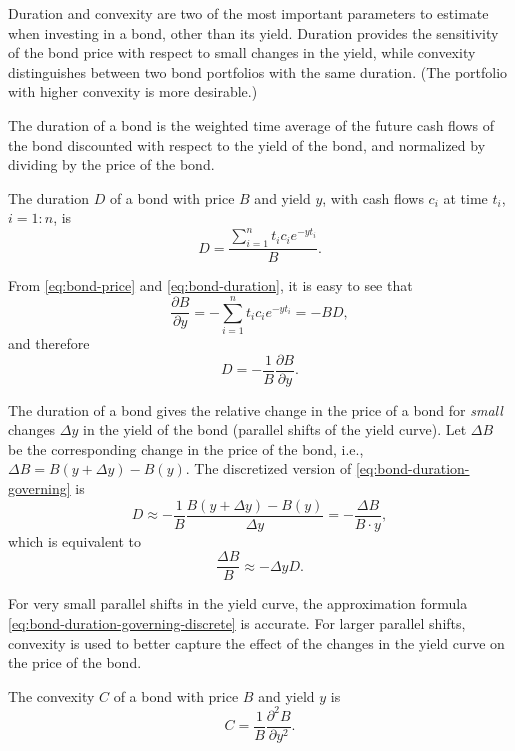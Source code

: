 Duration and convexity are two of the most important parameters to estimate
    when investing in a bond, other than its yield.
Duration provides the sensitivity of the bond price with respect to small
    changes in the yield, while convexity distinguishes between two bond
    portfolios with the same duration.
(The portfolio with higher convexity is more desirable.)

The duration of a bond is the weighted time average of the future cash flows of
    the bond discounted with respect to the yield of the bond, and normalized by
    dividing by the price of the bond.

\begin{definition}
    The duration $ D $ of a bond with price $ B $ and yield $ y $, with cash
        flows $ c_i $ at time $ t_i $, $ i = 1 : n $, is
    \begin{equation}
        D = \frac{\sum_{i=1}^{n} t_i c_i e^{-yt_i}}{B}.
        \label{eq:bond-duration}
    \end{equation}
\end{definition}

From \eqref{eq:bond-price} and \eqref{eq:bond-duration}, it is easy to see that
\begin{equation*}
    \frac{\partial B}{\partial y} = -\sum_{i=1}^{n} t_i c_i e^{-yt_i} = -B D,
\end{equation*}
and therefore
\begin{equation}
    D = -\frac{1}{B} \frac{\partial B}{\partial y}.
    \label{eq:bond-duration-governing}
\end{equation}

The duration of a bond gives the relative change in the price of a bond for
    \textit{small} changes $ \Delta y $ in the yield of the bond (parallel
    shifts of the yield curve).
Let $ \Delta B $ be the corresponding change in the price of the bond, i.e.,
    $ \Delta B = B(y + \Delta y) - B(y) $.
The discretized version of \eqref{eq:bond-duration-governing} is
\begin{equation*}
    D \approx -\frac{1}{B} \frac{B(y + \Delta y) - B(y)}{\Delta y} =
        -\frac{\Delta B}{B \cdot y},
\end{equation*}
which is equivalent to
\begin{equation}
    \frac{\Delta B}{B} \approx -\Delta y D.
    \label{eq:bond-duration-governing-discrete}
\end{equation}

For very small parallel shifts in the yield curve, the approximation formula
    \eqref{eq:bond-duration-governing-discrete} is accurate.
For larger parallel shifts, convexity is used to better capture the effect of
    the changes in the yield curve on the price of the bond.
\begin{definition}
    The convexity $ C $ of a bond with price $ B $ and yield $ y $ is
    \begin{equation}
        C = \frac{1}{B} \frac{\partial^2 B}{\partial y^2}.
        \label{eq:bond-convexity-govering}
    \end{equation}
\end{definition}

